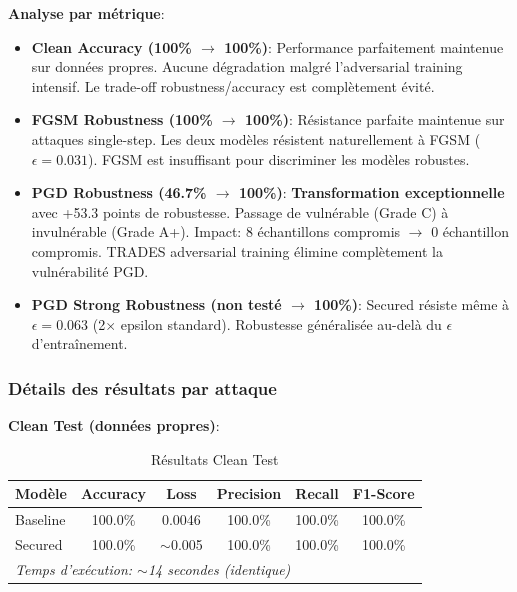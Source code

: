 \textbf{Analyse par métrique}:

\begin{itemize}
    \item \textbf{Clean Accuracy (100\% $\rightarrow$ 100\%)}: Performance parfaitement maintenue sur données propres. Aucune dégradation malgré l'adversarial training intensif. Le trade-off robustness/accuracy est complètement évité.

    \item \textbf{FGSM Robustness (100\% $\rightarrow$ 100\%)}: Résistance parfaite maintenue sur attaques single-step. Les deux modèles résistent naturellement à FGSM ($\epsilon=0.031$). FGSM est insuffisant pour discriminer les modèles robustes.

    \item \textbf{PGD Robustness (46.7\% $\rightarrow$ 100\%)}: \textbf{Transformation exceptionnelle} avec +53.3 points de robustesse. Passage de vulnérable (Grade C) à invulnérable (Grade A+). Impact: 8 échantillons compromis $\rightarrow$ 0 échantillon compromis. TRADES adversarial training élimine complètement la vulnérabilité PGD.

    \item \textbf{PGD Strong Robustness (non testé $\rightarrow$ 100\%)}: Secured résiste même à $\epsilon=0.063$ (2$\times$ epsilon standard). Robustesse généralisée au-delà du $\epsilon$ d'entraînement.
\end{itemize}

\subsubsection{Détails des résultats par attaque}

\textbf{Clean Test (données propres)}:

\begin{table}[h]
\centering
\caption{Résultats Clean Test}
\label{tab:clean_test}
\begin{tabular}{lccccc}
\hline
\textbf{Modèle} & \textbf{Accuracy} & \textbf{Loss} & \textbf{Precision} & \textbf{Recall} & \textbf{F1-Score} \\
\hline
Baseline & 100.0\% & 0.0046 & 100.0\% & 100.0\% & 100.0\% \\
Secured & 100.0\% & $\sim$0.005 & 100.0\% & 100.0\% & 100.0\% \\
\hline
\multicolumn{6}{l}{\textit{Temps d'exécution: $\sim$14 secondes (identique)}} \\
\hline
\end{tabular}
\end{table}


